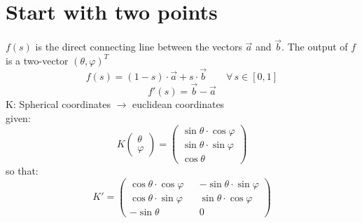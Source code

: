 \section{Start with two points}
$f(s)$ is the direct connecting line between the vectors  $\vec a$ and $\vec b$. The output of $f$ is a two-vector $(\theta, \varphi)^T$
\begin{equation}\label{line}
    f(s)=(1-s)\cdot\vec{a}+s\cdot\vec{b}\qquad\forall\, s \in [0,1]
\end{equation}
\begin{equation}
    f'(s)=\vec{b}-\vec{a}
\end{equation}
K: Spherical coordinates $\rightarrow$ euclidean coordinates\\
given:
\begin{equation}\label{euklid}
    K \begin{pmatrix}\theta \\ \varphi\end{pmatrix}=
    \begin{pmatrix}
        \sin\theta\cdot\cos\varphi \\
        \sin\theta\cdot\sin\varphi \\
        \cos\theta
    \end{pmatrix}
\end{equation}
so that:
\begin{equation}
    K'=
    \begin{pmatrix}
       \cos\theta\cdot\cos\varphi && -\sin\theta\cdot\sin\varphi \\
       \cos\theta\cdot\sin\varphi && \sin\theta\cdot\cos\varphi \\
       -\sin\theta && 0
    \end{pmatrix}
\end{equation}
